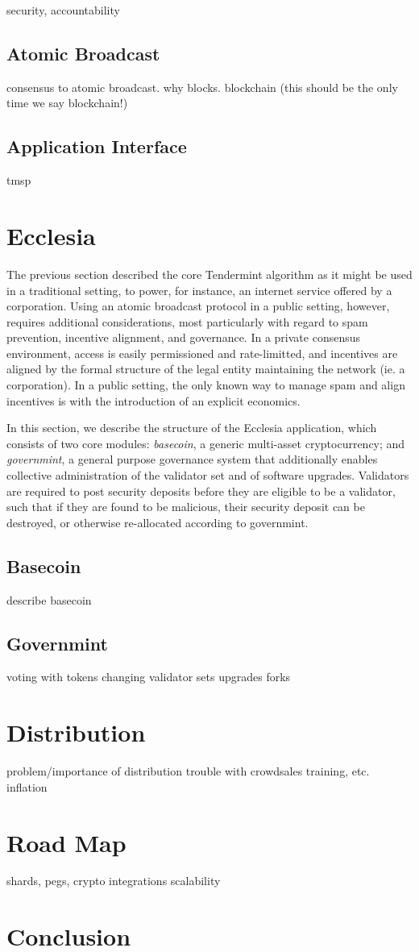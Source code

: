 \documentclass[12pt]{article}
\begin{document}
security, accountability

\subsection{Atomic Broadcast}
consensus to atomic broadcast. why blocks. blockchain (this should be the only time we say blockchain!)

\subsection{Application Interface}
tmsp

\section{ Ecclesia }

The previous section described the core Tendermint algorithm
as it might be used in a traditional setting, to power, for instance,
an internet service offered by a corporation.
Using an atomic broadcast protocol in a public setting, however,
requires additional considerations, most particularly with regard to
spam prevention, incentive alignment, and governance.
In a private consensus environment, access is easily permissioned and rate-limitted,
and incentives are aligned by the formal structure of the legal entity maintaining the network (ie. a corporation).
In a public setting, the only known way to manage spam and align incentives is with the introduction of 
an explicit economics.

In this section, we describe the structure of the Ecclesia application,
which consists of two core modules: \emph{basecoin},  a generic multi-asset cryptocurrency;
and \emph{governmint}, a general purpose governance system that additionally enables collective administration of the validator set and of software upgrades.
Validators are required to post security deposits before they are eligible to be a validator,
such that if they are found to be malicious, their security deposit can be destroyed, 
or otherwise re-allocated according to governmint.

\subsection{ Basecoin }
describe basecoin

\subsection{ Governmint }
voting with tokens
changing validator sets
upgrades
forks

\section{ Distribution }
problem/importance of distribution
trouble with crowdsales
training, etc.
inflation

\section{Road Map}
shards, pegs, crypto
integrations
scalability

\section{Conclusion}



\printbibliography
\end{document}
